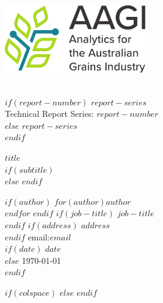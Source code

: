 \documentclass[$if(fontsize)$$fontsize$,$endif$$if(lang)$$lang$,$endif$$if(papersize)$$papersize$,$endif$$for(classoption)$$classoption$$sep$,$endfor$]{$documentclass$}
\begin{document}

\thispagestyle{empty}
\vspace*{-30mm}

\begin{center}
\includegraphics[height = 3cm]{assets/AAGI_logo}
\end{center}


\vfill

\begin{flushright}
\HRule\\[5mm]


\huge
$if(report-number)$
\textcolor{AAGI}{\sbf $report-series$ \\Technical Report Series: $report-number$}\\[6mm]
$else$
\textcolor{AAGI}{\sbf $report-series$}\\[6mm]
$endif$

{\sbf $title$}\\
\Large
$if(subtitle)$
\vspace{2mm}{\sbf $subtitle$}\\[5mm]
$else$
\vspace{2mm}
$endif$

\sf\normalsize
$if(author)$
$for(author)$$author$\\ $endfor$
$endif$
$if(job-title)$
$job-title$\\
$endif$
$if(address)$
$address$\\
$endif$
\vspace*{0.4cm}
email:\;$email$\\[8mm]

$if(date)$
$date$\\
$else$
\today\\
$endif$
\HRule
\end{flushright}



$if(colspace)$
\setlength{\tabcolsep}{$colspace$}
$else$
\setlength{\tabcolsep}{12pt}
$endif$

\vfill
\end{document}
